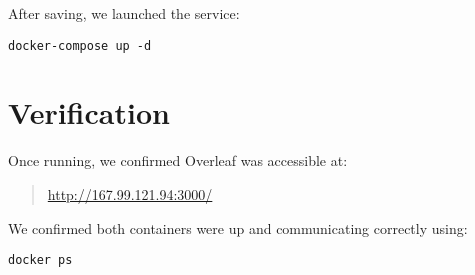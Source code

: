 After saving, we launched the service:
\begin{verbatim}
docker-compose up -d
\end{verbatim}

\section{Verification}
Once running, we confirmed Overleaf was accessible at:
\begin{quote}
\url{http://167.99.121.94:3000/}
\end{quote}

We confirmed both containers were up and communicating correctly using:
\begin{verbatim}
docker ps
\end{verbatim}